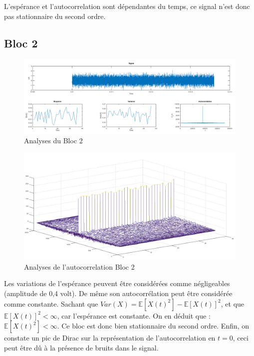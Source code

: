 \documentclass[french, a4paper, 12pt, openany]{book}
\begin{document}
	L'espérance et l'autocorrelation sont dépendantes du temps, ce signal n'est donc pas stationnaire du second ordre.
  \subsection{Bloc 2}

	\begin{figure}[ht]
		\begin{center}
		\includegraphics[scale=0.25]{images/SignalBloc2.png}
		\end{center}
		\caption{Analyses du Bloc 2}
		\label{Analyses du Bloc 2}
	\end{figure}

	\begin{figure}[ht]
		\begin{center}
		\includegraphics[scale=0.25]{images/AutoCorrBloc2.png}
		\end{center}
		\caption{Analyses de l'autocorrelation Bloc 2}
		\label{Analyses de l'autocorrelation Bloc 2}
	\end{figure}

	Les variations de l'espérance peuvent être considérées comme négligeables (amplitude de 0,4 volt). De même son autocorrélation peut être considérée comme constante.
	Sachant que \begin{math}Var(X) = \mathbb{E}[X(t)^2] - \mathbb{E}[X(t)]^2\end{math}, et que \begin{math}\mathbb{E}[X(t)]^2<\infty\end{math}, car l'espérance est constante. On en déduit que : \begin{math}\mathbb{E}[X(t)^2]<\infty\end{math}. Ce bloc est donc bien stationnaire du second ordre.
	Enfin, on constate un pic de Dirac sur la représentation de l'autocorrelation en \(t = 0\), ceci peut être dû à la présence de bruits dans le signal.
\end{document}
